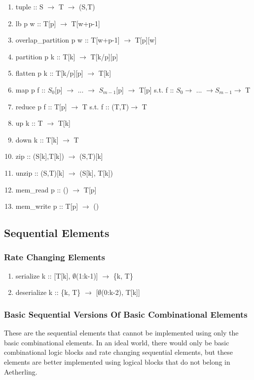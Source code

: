 \documentclass[11pt,fleqn]{article}
\numberwithin{equation}{subsection}
\begin{document}
\begin{enumerate}
    \item tuple :: S $\rightarrow$ T $\rightarrow$ (S,T)
    \item lb p w :: T[p] $\rightarrow$ T[w+p-1]
    \item overlap\_partition p w :: T[w+p-1] $\rightarrow$ T[p][w]
    \item partition p k :: T[k] $\rightarrow$ T[k/p][p]
    \item flatten p k :: T[k/p][p] $\rightarrow$ T[k]
    \item map p f :: $S_0$[p] $\rightarrow$ ... $\rightarrow$ $S_{m-1}$[p] $\rightarrow$ 
        T[p]
        \subitem s.t. f :: $S_0 \rightarrow$ ... $\rightarrow S_{m-1} \rightarrow$ T 
    \item reduce p f :: T[p] $\rightarrow$ T
        \subitem s.t. f :: (T,T)$\rightarrow$ T
    \item up k :: T $\rightarrow$ T[k]
    \item down k :: T[k] $\rightarrow$ T
    \item zip :: (S[k],T[k]) $\rightarrow$ (S,T)[k]
    \item unzip :: (S,T)[k] $\rightarrow$ (S[k], T[k])
    \item mem\_read p :: () $\rightarrow$ T[p]
    \item mem\_write p :: T[p] $\rightarrow$ ()
\end{enumerate}

\subsection{Sequential Elements}

\subsubsection{Rate Changing Elements}

\begin{enumerate}
    \item serialize k :: [T[k], $\emptyset$(1:k-1)] $\rightarrow$ \{k, T\}
    \item deserialize k :: \{k, T\} $\rightarrow$ [$\emptyset$(0:k-2), T[k]]
\end{enumerate}

\subsubsection{Basic Sequential Versions Of Basic Combinational Elements}
These are the sequential elements that cannot be implemented using only the basic
combinational elements. In an ideal world, there would only be basic
combinational logic blocks and rate changing sequential elements, but these
elements are better implemented using logical blocks that do not belong in
Aetherling.
\end{document}
